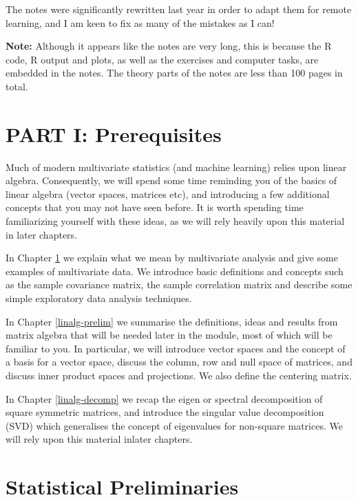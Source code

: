 \documentclass[
]{book}
\theoremstyle{definition}
\theoremstyle{definition}
\theoremstyle{definition}
\theoremstyle{definition}
\theoremstyle{remark}
\begin{document}
The notes were significantly rewritten last year in order to adapt them for remote learning, and I am keen to fix as many of the mistakes as I can!

\textbf{Note:} Although it appears like the notes are very long, this is because the R code, R output and plots, as well as the exercises and computer tasks, are embedded in the notes. The theory parts of the notes are less than 100 pages in total.

\hypertarget{part-i-prerequisites}{%
\chapter*{PART I: Prerequisites}\label{part-i-prerequisites}}

Much of modern multivariate statistics (and machine learning) relies upon linear algebra. Consequently, we will spend some time reminding you of the basics of linear algebra (vector spaces, matrices etc), and introducing a few additional concepts that you may not have seen before. It is worth spending time familiarizing yourself with these ideas, as we will rely heavily upon this material in later chapters.

In Chapter \ref{stat-prelim} we explain what we mean by multivariate analysis and give some examples of multivariate data. We introduce basic definitions and concepts such as the sample covariance matrix, the sample correlation matrix and describe some simple exploratory data analysis techniques.

In Chapter \ref{linalg-prelim} we summarise the definitions, ideas and results from matrix algebra that will be needed later in the module, most of which will be familiar to you. In particular, we will introduce vector spaces and the concept of a basis for a vector space, discuss the column, row and null space of matrices, and discuss inner product spaces and projections. We also define the centering matrix.

In Chapter \ref{linalg-decomp} we recap the eigen or spectral decomposition of square symmetric matrices, and introduce the singular value decomposition (SVD) which generalises the concept of eigenvalues for non-square matrices. We will rely upon this material inlater chapters.

\hypertarget{stat-prelim}{%
\chapter{Statistical Preliminaries}\label{stat-prelim}}
\end{document}
